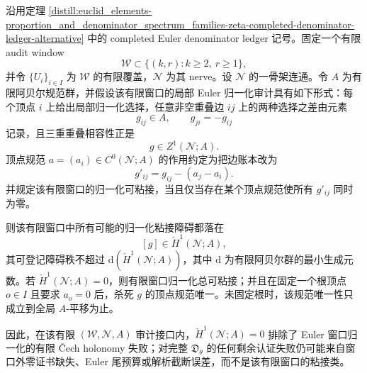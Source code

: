 \begin{proposition}\label{distill:cech_cohomology-finite_nerve_obstruction_bounds-zeta-euler-window-normalization-gluing}
沿用定理 \ref{distill:euclid_elements-proportion_and_denominator_spectrum_families-zeta-completed-denominator-ledger-alternative} 中的 completed Euler denominator ledger 记号。固定一个有限 audit window
\[
\mathcal W\subset\{(k,r):k\ge2,\ r\ge1\},
\]
并令 \(\{U_i\}_{i\in I}\) 为 \(\mathcal W\) 的有限覆盖，\(\mathcal N\) 为其 nerve。设 \(\mathcal N\) 的一骨架连通。令 \(A\) 为有限阿贝尔规范群，并假设该有限窗口的局部 Euler 归一化审计具有如下形式：每个顶点 \(i\) 上给出局部归一化选择，任意非空重叠边 \(ij\) 上的两种选择之差由元素
\[
g_{ij}\in A,\qquad g_{ji}=-g_{ij}
\]
记录，且三重重叠相容性正是
\[
g\in Z^1(\mathcal N;A).
\]
顶点规范 \(a=(a_i)\in C^0(\mathcal N;A)\) 的作用约定为把边账本改为
\[
g'_{ij}=g_{ij}-(a_j-a_i).
\]
并规定该有限窗口的归一化可粘接，当且仅当存在某个顶点规范使所有 \(g'_{ij}\) 同时为零。

则该有限窗口中所有可能的归一化粘接障碍都落在
\[
[g]\in\check H^1(\mathcal N;A),
\]
其可登记障碍秩不超过 \(\mathrm d(\check H^1(\mathcal N;A))\)，其中 \(\mathrm d\) 为有限阿贝尔群的最小生成元数。若 \(\check H^1(\mathcal N;A)=0\)，则有限窗口归一化总可粘接；并且在固定一个根顶点 \(o\in I\) 且要求 \(a_o=0\) 后，杀死 \(g\) 的顶点规范唯一。未固定根时，该规范唯一性只成立到全局 \(A\)-平移为止。

因此，在该有限 \((\mathcal W,\mathcal N,A)\) 审计接口内，\(\check H^1(\mathcal N;A)=0\) 排除了 Euler 窗口归一化的有限 \v Cech holonomy 失败；对完整 \(\mathfrak D_\theta\) 的任何剩余认证失败仍可能来自窗口外零证书缺失、Euler 尾预算或解析截断误差，而不是该有限窗口的粘接类。
\end{proposition}

